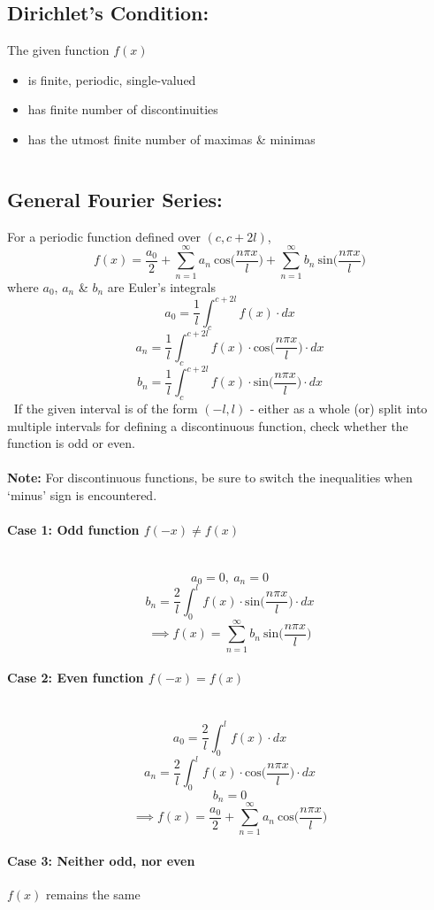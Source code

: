 \documentclass{article}
\newcommand{\para}[1]{\paragraph{#1}\mbox{}\\}
\begin{document}
{\subsection{{\LARGE Dirichlet's Condition:}}
The given function $f(x)$
\begin{itemize}
\item is finite, periodic, single-valued
\item has finite number of discontinuities
\item has the utmost finite number of maximas \& minimas
\end{itemize}
$\ $
\subsection{\LARGE General Fourier Series:}
For a periodic function defined over {\LARGE $(c,c+2l)$},
{\LARGE $$f(x)=\frac{a_0}{2}+\sum_{n=1}^\infty a_n\ \mathrm{cos}\bigg(\frac{n\pi x}{l}\bigg)+\sum_{n=1}^\infty b_n\ \mathrm{sin}\bigg(\frac{n\pi x}{l}\bigg)$$}
where {\LARGE $a_0$}, {\LARGE $a_n$} \& {\LARGE $b_n$} are Euler's integrals
{\LARGE $$a_0=\frac{1}l\int_c^{c+2l} f(x)\cdot dx$$
$$a_n=\frac{1}l\int_c^{c+2l} f(x)\cdot \mathrm{cos}\bigg(\frac{n\pi x}{l}\bigg)\cdot dx$$
$$b_n=\frac{1}l\int_c^{c+2l} f(x)\cdot \mathrm{sin}\bigg(\frac{n\pi x}{l}\bigg)\cdot dx$$}
$\ $
If the given interval is of the form {\LARGE {\LARGE $(-l,l)$}} - either as a whole (or) split into multiple intervals for defining a discontinuous function, check whether the function is odd or even.
\\
\\
\textbf{Note:} For discontinuous functions, be sure to switch the inequalities when `minus' sign is encountered.
\para{\Large Case 1: Odd function {\LARGE $f(-x)\neq f(x)$}}
{\LARGE $$a_0=0,\ a_n=0$$
$$b_n=\frac{2}l\int_0^lf(x)\cdot \mathrm{sin}\bigg(\frac{n\pi x}{l}\bigg)\cdot dx$$
$$\implies f(x)=\sum_{n=1}^\infty b_n\ \mathrm{sin}\bigg(\frac{n\pi x}{l}\bigg)$$}
\para{\Large Case 2: Even function {\LARGE $f(-x)=f(x)$}}
{\LARGE $$a_0=\frac{2}l\int_0^l f(x)\cdot dx$$
$$a_n=\frac{2}l\int_0^l f(x)\cdot \mathrm{cos}\bigg(\frac{n\pi x}{l}\bigg)\cdot dx$$
$$b_n=0$$
$$\implies f(x)=\frac{a_0}2+\sum_{n=1}^\infty a_n\ \mathrm{cos}\bigg(\frac{n\pi x}{l}\bigg)$$}
\paragraph{\Large Case 3: Neither odd, nor even}
\begin{center}
{\LARGE $f(x)$} remains the same
\end{center}
$\ $
}
\end{document}
